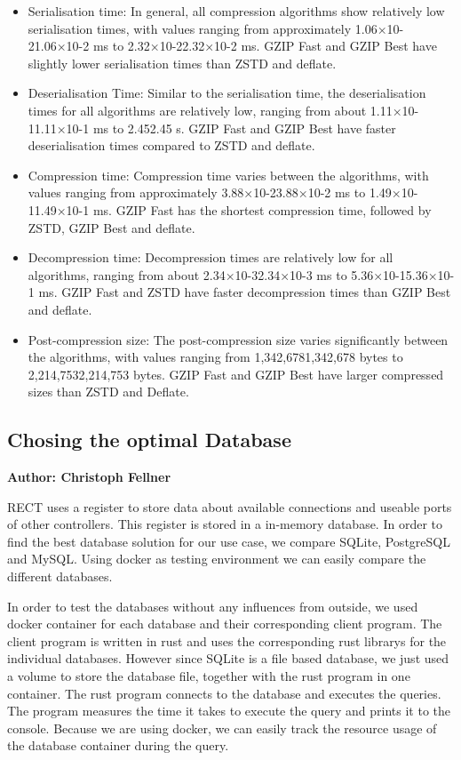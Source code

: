 \begin{itemize}
\item Serialisation time: In general, all compression algorithms show relatively low serialisation times, with values ranging from approximately 1.06×10-21.06×10-2 ms to 2.32×10-22.32×10-2 ms. GZIP Fast and GZIP Best have slightly lower serialisation times than ZSTD and deflate.
\item Deserialisation Time: Similar to the serialisation time, the deserialisation times for all algorithms are relatively low, ranging from about 1.11×10-11.11×10-1 ms to 2.452.45 s. GZIP Fast and GZIP Best have faster deserialisation times compared to ZSTD and deflate.
\item Compression time: Compression time varies between the algorithms, with values ranging from approximately 3.88×10-23.88×10-2 ms to 1.49×10-11.49×10-1 ms. GZIP Fast has the shortest compression time, followed by ZSTD, GZIP Best and deflate.
\item Decompression time: Decompression times are relatively low for all algorithms, ranging from about 2.34×10-32.34×10-3 ms to 5.36×10-15.36×10-1 ms. GZIP Fast and ZSTD have faster decompression times than GZIP Best and deflate.
\item Post-compression size: The post-compression size varies significantly between the algorithms, with values ranging from 1,342,6781,342,678 bytes to 2,214,7532,214,753 bytes. GZIP Fast and GZIP Best have larger compressed sizes than ZSTD and Deflate.
\end{itemize}


\subsection{Chosing the optimal Database}
\textbf{Author: Christoph Fellner}

RECT uses a register to store data about available connections and useable ports of other controllers. This register is stored in a in-memory database. In order to find the 
best database solution for our use case, we compare SQLite, PostgreSQL and MySQL. Using docker as testing environment we can easily compare the different databases.\newline

In order to test the databases without any influences from outside, we used docker container for each database and their corresponding client program. The client program
is written in rust and uses the corresponding rust librarys for the individual databases. However since SQLite is a file based database, we just used a volume to store the
database file, together with the rust program in one container. The rust program connects to the database and executes the queries. The program measures the time it 
takes to execute the query and prints it to the console. Because we are using docker, we can easily track the resource usage of the database container during the query.\newline

